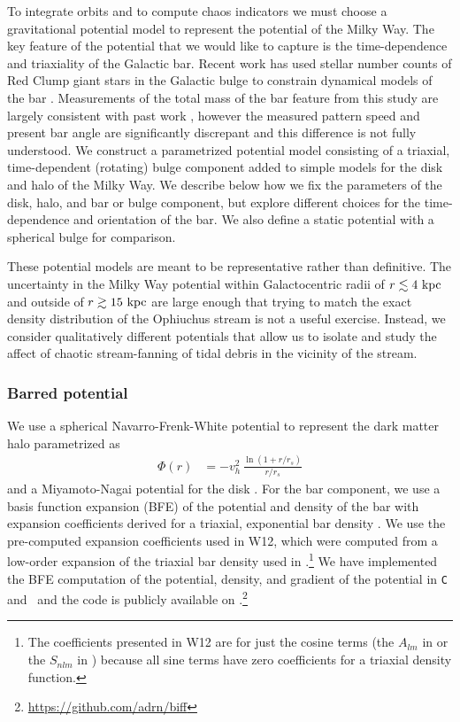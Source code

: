 To integrate orbits and to compute chaos indicators we must choose a gravitational potential model to represent the potential of the Milky Way. The key feature of the potential that we would like to capture is the time-dependence and triaxiality of the Galactic bar. Recent work has used stellar number counts of Red Clump giant stars in the Galactic bulge to constrain dynamical models of the bar \citep{portail15}. Measurements of the total mass of the bar feature from this study are largely consistent with past work \citep[e.g.,][]{wang12}, however the measured pattern speed and present bar angle are significantly discrepant and this difference is not fully understood. We construct a parametrized potential model consisting of a triaxial, time-dependent (rotating) bulge component added to simple models for the disk and halo of the Milky Way. We describe below how we fix the parameters of the disk, halo, and bar or bulge component, but explore different choices for the time-dependence and orientation of the bar. We also define a static potential with a spherical bulge for comparison. 

These potential models are meant to be representative rather than definitive. The uncertainty in the Milky Way potential within Galactocentric radii of $r\lesssim 4~{\rm kpc}$ and outside of $r\gtrsim 15~{\rm kpc}$ are large enough that trying to match the exact density distribution of the Ophiuchus stream is not a useful exercise. Instead, we consider qualitatively different potentials that allow us to isolate and study the affect of chaotic stream-fanning of tidal debris in the vicinity of the stream. 

\subsubsection{Barred potential}
We use a spherical Navarro-Frenk-White potential to represent the dark matter halo \citep{navarro96} parametrized as
\begin{align}
	\Phi(r) &= -v_h^2\,\frac{\ln{(1 + r/r_s)}}{r/r_s}\label{eq:nfw}
\end{align}
and a Miyamoto-Nagai potential for the disk \citep{miyamoto75}. For the bar component, we use a basis function expansion (BFE) of the potential and density of the bar with expansion coefficients derived for a triaxial, exponential bar density \citep[][hereafter W12]{wang12}. We use the pre-computed expansion coefficients used in W12, which were computed from a low-order expansion of the triaxial bar density used in \citet{dwek95}.\footnote{The coefficients presented in W12 are for just the cosine terms (the $A_{lm}$ in \citet{hernquist92} or the $S_{nlm}$ in \citet{lowing11}) because all sine terms have zero coefficients for a triaxial density function.} We have implemented the BFE computation of the potential, density, and gradient of the potential in \texttt{C} and \python\ and the code is publicly available on \github.\footnote{\url{https://github.com/adrn/biff}} 

